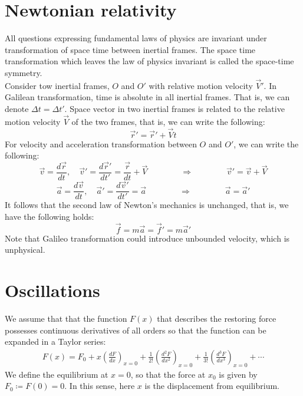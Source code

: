 \documentclass[11pt,oneside]{book}
\theoremstyle{break}
\theoremstyle{break}
\begin{document}
\newpage
\section[Newtonian relativity]{\color{red}Newtonian relativity\color{black}}
All questions expressing fundamental laws of physics are invariant under transformation of space time between inertial frames. The space time transformation which leaves the law of physics invariant is called the space-time symmetry. \\

Consider tow inertial frames, $O$ and $O'$ with relative motion velocity $\vec{V}'$. In Galilean transformation, time is absolute in all inertial frames. That is, we can denote $\Delta t = \Delta t'$. Space vector in two inertial frames is related to the relative motion velocity $\vec{V}$ of the two frames, that is, we can write the following:
$$\vec{r}' = \vec{r}' + \vec{V}t$$
For velocity and acceleration transformation between $O$ and $O'$, we can write the following:
$$\vec{v} = \frac{d\vec{r}}{dt},\quad \vec{v}' = \frac{d\vec{r}'}{dt'} = \frac{\vec{r}}{dt}+\vec{V} \qquad\qquad \Rightarrow \qquad\qquad \vec{v}' = \vec{v}+\vec{V}$$
$$\vec{a} = \frac{d\vec{v}}{dt},\quad \vec{a}' = \frac{d\vec{v}'}{dt'} = \vec{a}\qquad\qquad \Rightarrow\qquad \qquad \vec{a} = \vec{a}'$$
It follows that the second law of Newton's mechanics is unchanged, that is, we have the following holds:
$$\vec{f} = m\vec{a} = \vec{f}' = m\vec{a}'$$
Note that Galileo transformation could introduce unbounded velocity, which is unphysical. 


\newpage
\section[Oscillations]{\color{red}Oscillations\color{black}}
We assume that that the function $F(x)$ that describes the restoring force possesses continuous derivatives of all orders so that the function can be expanded in a Taylor series:
\begin{align*}
F(x) = F_0 + x\left(\frac{dF}{dx} \right)_{x=0}+ \frac{1}{2!}\left(\frac{d^2F}{dx^2} \right)_{x=0}+\frac{1}{3!}\left(\frac{d^3F}{dx^3} \right)_{x=0}+\cdots
\end{align*}
We define the equilibrium at $x=0$, so that the force at $x_0$ is given by $F_0\coloneqq F(0) = 0$. In this sense, here $x$ is the displacement from equilibrium. \\
\end{document}
